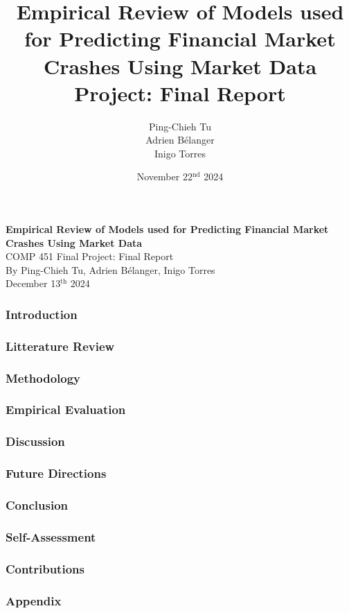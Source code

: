 \documentclass[12pt, letterpaper]{article}
\title{Empirical Review of Models used for Predicting Financial Market Crashes Using Market Data \\[1em] \large Project: Final Report}
\author{\normalsize Ping-Chieh Tu \\ Adrien Bélanger \\ Inigo Torres}
\date{\vspace{2em} November 22$^{\text{nd}}$ 2024}
\begin{document}
\begin{titlepage}
    \centering
    \vspace*{2in}
    {\LARGE \textbf{Empirical Review of Models used for Predicting Financial Market Crashes Using Market Data}}\\
    \vspace*{0.5in}
    {\large COMP 451 Final Project: Final Report}\\[4in]
    \normalsize
    By Ping-Chieh Tu, Adrien Bélanger, Inigo Torres \\ [3em]
    December 13$^{\text{th}}$ 2024
\end{titlepage}
\pagebreak

\subsubsection*{Introduction}

\subsubsection*{Litterature Review}

\subsubsection*{Methodology}

\subsubsection*{Empirical Evaluation}

\subsubsection*{Discussion}

\subsubsection*{Future Directions}

\subsubsection*{Conclusion}

\subsubsection*{Self-Assessment}

\subsubsection*{Contributions}

\subsubsection*{Appendix}




\pagebreak
\cite{Ahmed} %
\printbibliography
\end{document}
